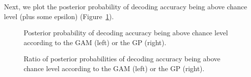 \documentclass[
  doc,
  floatsintext,
  longtable,
  a4paper,
  nolmodern,
  notxfonts,
  notimes,
  colorlinks=true,linkcolor=blue,citecolor=blue,urlcolor=blue]{apa7}
\begin{document}
Next, we plot the posterior probability of decoding accuracy being above
chance level (plus some epsilon) (Figure~\ref{fig-decoding-post}).

\begin{figure}[!htb]

\caption{\label{fig-decoding-post}Posterior probability of decoding
accuracy being above chance level according to the GAM (left) or the GP
(right).}


\end{figure}%

\begin{figure}[!htb]

\caption{\label{fig-decoding-ratio}Ratio of posterior probabilities of
decoding accuracy being above chance level according to the GAM (left)
or the GP (right).}


\end{figure}%
\end{document}
